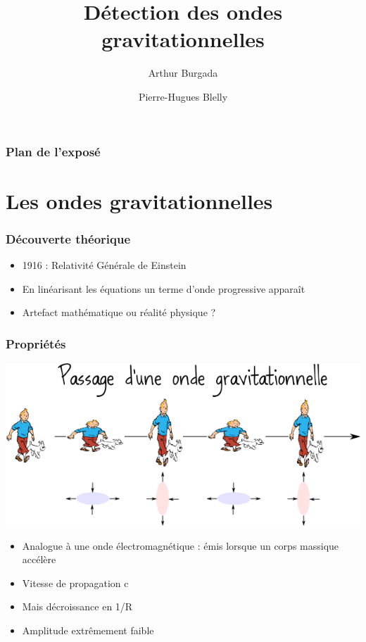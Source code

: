 \documentclass{beamer}
\date{}
\author{Arthur Burgada \and Pierre-Hugues Blelly}
\title{Détection des ondes gravitationnelles}
\begin{document}
\begin{frame}
	\titlepage
\end{frame}

\begin{frame}
	\frametitle{Plan de l'exposé}
	\tableofcontents
\end{frame}

\section{Les ondes gravitationnelles}
\begin{frame}
	\frametitle{Découverte théorique}
	\begin{itemize}
		\item 1916 : Relativité Générale de Einstein
		\item En linéarisant les équations un terme d'onde progressive apparaît
		\item Artefact mathématique ou réalité physique ?
	\end{itemize}
\end{frame}

\begin{frame}
\frametitle{Propriétés}
	\center\includegraphics[scale = 0.4]{Docs/tintin.png}
	\bigskip
	\begin{itemize}
		\item Analogue à une onde électromagnétique : émis lorsque un corps massique accélère
		\item Vitesse de propagation c
		\item Mais décroissance en 1/R
		\item Amplitude extrêmement faible
	\end{itemize}
\end{frame}
\end{document}

